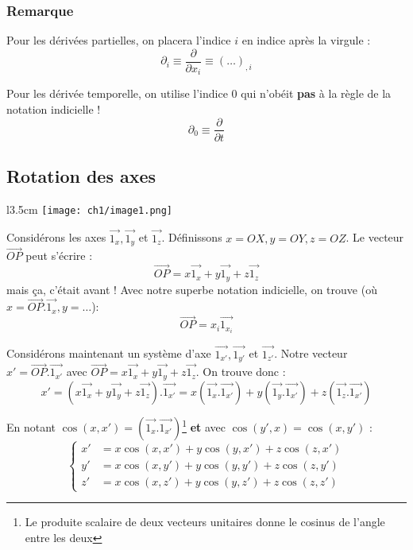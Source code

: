 \subsubsection{Remarque}
Pour les dérivées partielles, on placera l'indice $i$ en indice après la virgule :
\begin{equation}
	\partial_i \equiv \frac{\partial}{\partial x_i} \equiv (\dots)_{,i}
\end{equation}
        
Pour les dérivée temporelle, on utilise l'indice 0 qui n'obéit \textbf{pas} à la
règle de la notation indicielle ! 
\begin{equation}
	\partial_0 \equiv \frac{\partial}{\partial t}
\end{equation}


\newpage
\subsection{Rotation des axes}
\begin{wrapfigure}[7]{l}{3.5cm}
	\texttt{[image: ch1/image1.png]}
\end{wrapfigure}
Considérons les axes $\vec{1_x}, \vec{1_y}$ et $\vec{1_z}$. Définissons $x = OX, y = OY, 
z = OZ$. Le vecteur $\vec{OP}$ peut s'écrire :
\begin{equation}
	\vec{OP} = x\vec{1_x} + y\vec{1_y}+z\vec{1_z}
\end{equation}
mais ça, c'était avant ! Avec notre superbe notation indicielle, on trouve (où $x = \vec{OP}.
\vec{1_x}, y = \dots$):
\begin{equation}
	\vec{OP} = x_i\vec{1_{x_i}}
\end{equation}
    
Considérons maintenant un système d'axe $\vec{1_{x'}}, \vec{1_{y'}}$ et $\vec{1_{z'}}$. Notre
vecteur $x' = \vec{OP}.\vec{1_{x'}}$ avec $\vec{OP} = x\vec{1_x} + y\vec{1_y}+z\vec{1_z}$. On
trouve donc :
\begin{equation}
	x' = ( x\vec{1_x} + y\vec{1_y}+z\vec{1_z}).\vec{1_{x'}} = x(\vec{1_x}.\vec{1_{x'}}) + y(\vec{1_y}
	.\vec{1_{x'}}) + z(\vec{1_z}.\vec{1_{x'}})
\end{equation}
    
En notant $\cos(x,x') = (\vec{1_x}.\vec{1_{x'}})$\footnote{Le produite scalaire de deux vecteurs
	unitaires donne le cosinus de l'angle entre les deux} \textbf{et} avec $\cos(y',x) = \cos(x,y')$ :
\begin{equation}
	\left\{\begin{array}{ll}
	x' &=  x\cos(x,x') + y\cos(y,x') + z\cos(z,x')\\
	y' &=  x\cos(x,y') + y\cos(y,y') + z\cos(z,y')\\ 
	z' &=  x\cos(x,z') + y\cos(y,z') + z\cos(z,z')
	\end{array}\right.
\end{equation}
    

